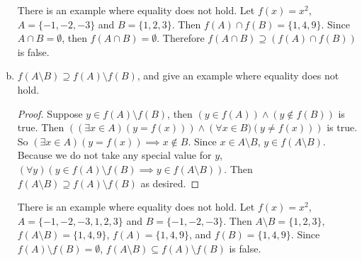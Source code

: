 \documentclass{article}
\begin{document}
\begin{enumerate}[(a)]
    There is an example where equality does not hold. Let $f(x) = x ^ 2$, $A = \{-1, -2, -3\}$ and $B = \{1, 2, 3\}$. Then $f(A) \cap f(B) = \{1, 4, 9\}$. Since $A \cap B = \emptyset$, then $f(A \cap B) = \emptyset$. Therefore $f(A \cap B) \supseteq \left( f(A) \cap f(B) \right)$ is false.
    
    \item $f(A \setminus B) \supseteq f(A) \setminus f(B)$, and give an example where equality does not hold.
    
    \begin{proof}
    Suppose $y \in f(A) \setminus f(B)$, then $\left( y \in f(A) \right) \land \left( y \notin f(B) \right)$ is true. Then $\left( (\exists x \in A) \left( y = f(x) \right) \right) \land \left (\forall x \in B) \left( y \neq f(x) \right) \right)$ is true. So $(\exists x \in A) \left( y = f(x) \right) \implies x \notin B$. Since $x \in A \setminus B$, $y \in f(A \setminus B)$. Because we do not take any special value for $y$, $(\forall y) \left( y \in f(A) \setminus f(B) \implies y \in f(A \setminus B) \right)$. Then $f(A \setminus B) \supseteq f(A) \setminus f(B)$ as desired.
    \end{proof}
    
    There is an example where equality does not hold. Let $f(x) = x^2$, $A = \{-1, -2, -3, 1, 2, 3\}$ and $B = \{-1, -2, -3\}$. Then $A \setminus B = \{1, 2, 3\}$, $f(A \setminus B) = \{1, 4, 9\}$, $f(A) = \{1, 4, 9\}$, and $f(B) = \{1, 4, 9\}$. Since $f(A) \setminus f(B) = \emptyset$, $f(A \setminus B) \subseteq f(A) \setminus f(B)$ is false.
    
\end{enumerate}
\end{document}

